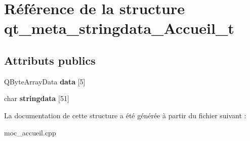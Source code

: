 \hypertarget{structqt__meta__stringdata___accueil__t}{\section{Référence de la structure qt\+\_\+meta\+\_\+stringdata\+\_\+\+Accueil\+\_\+t}
\label{structqt__meta__stringdata___accueil__t}
}
\subsection*{Attributs publics}
\begin{DoxyCompactItemize}
\item 
\hypertarget{structqt__meta__stringdata___accueil__t_aa3c8066f1a50a643db8e1e5dc301cb9f}{Q\+Byte\+Array\+Data {\bfseries data} \mbox{[}5\mbox{]}}\label{structqt__meta__stringdata___accueil__t_aa3c8066f1a50a643db8e1e5dc301cb9f}

\item 
\hypertarget{structqt__meta__stringdata___accueil__t_a9af13560b0f4dd3dd3a759e3feb2af1d}{char {\bfseries stringdata} \mbox{[}51\mbox{]}}\label{structqt__meta__stringdata___accueil__t_a9af13560b0f4dd3dd3a759e3feb2af1d}

\end{DoxyCompactItemize}


La documentation de cette structure a été générée à partir du fichier suivant \+:\begin{DoxyCompactItemize}
\item 
moc\+\_\+accueil.\+cpp\end{DoxyCompactItemize}
